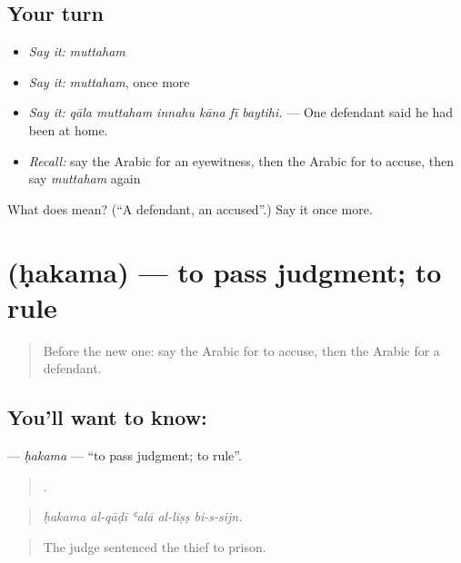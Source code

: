 \subsection*{Your turn}
\begin{itemize}
\raggedright
  \item \emph{Say it:} \emph{muttaham}
  \item \emph{Say it:} \emph{muttaham}, once more
  \item \emph{Say it:} \emph{qāla muttaham innahu kāna fī baytihi.} — One defendant said he had been at home.
  \item \emph{Recall:} say the Arabic for an eyewitness, then the Arabic for to accuse, then say \emph{muttaham} again
\end{itemize}

\begin{tcolorbox}[breakable,colback=teal!4,colframe=teal!35!black,title={Before you move on}]
What does  mean? (\textquotedblleft{}A defendant, an accused\textquotedblright{}.) Say it once more.
\end{tcolorbox}
\section[\texorpdfstring{\ar{حكم} (ḥakama)}{حكم (ḥakama)}]{ (ḥakama) — to pass judgment; to rule}

\label{lesson:AR-C305-hakama}



\begin{quote}
Before the new one: say the Arabic for to accuse, then the Arabic for a defendant.
\end{quote}

\subsection*{You'll want to know: }
\textbf{} — \emph{ḥakama} — \textquotedblleft{}to pass judgment; to rule\textquotedblright{}.

\begin{quote}
    .
\end{quote}

\begin{quote}
\emph{ḥakama al-qāḍī ʿalā al-liṣṣ bi-s-sijn.}
\end{quote}

\begin{quote}
The judge sentenced the thief to prison.
\end{quote}

